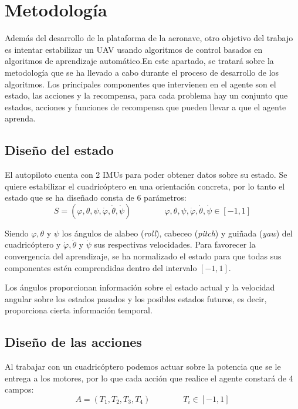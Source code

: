 \chapter{Metodología}

Además del desarrollo de la plataforma de la aeronave, otro objetivo del trabajo es intentar estabilizar un UAV usando algoritmos de control basados en algoritmos de aprendizaje automático.En este apartado, se tratará sobre la metodología que se ha llevado a cabo durante el proceso de desarrollo de los algoritmos. Los principales componentes que intervienen en el agente son el estado, las acciones y la recompensa, para cada problema hay un conjunto que estados, acciones y funciones de recompensa que pueden llevar a que el agente aprenda.

\section{Diseño del estado}
 El autopiloto cuenta con 2 IMUs para poder obtener datos sobre su estado. Se quiere estabilizar el cuadricóptero en una orientación concreta, por lo tanto el estado que se ha diseñado consta de 6 parámetros:
\begin{equation}
	S=(\varphi,\theta,\psi,\dot\varphi,\dot\theta,\dot\psi) \qquad\qquad \varphi,\theta,\psi,\dot\varphi,\dot\theta,\dot\psi \in [-1,1]
\end{equation} 

Siendo $\varphi,\theta$ y $\psi$ los ángulos de alabeo (\textit{roll}), cabeceo (\textit{pitch}) y guiñada (\textit{yaw}) del cuadricóptero y $\dot\varphi,\dot\theta$ y $\dot\psi$ sus respectivas velocidades. Para favorecer la convergencia del aprendizaje, se ha normalizado el estado para que todas sus componentes estén comprendidas dentro del intervalo $[-1,1]$.

Los ángulos proporcionan información sobre el estado actual y la velocidad angular sobre los estados pasados y los posibles estados futuros, es decir, proporciona cierta información temporal. 

\section{Diseño de las acciones}
Al trabajar con un cuadricóptero podemos actuar sobre la potencia que se le entrega a los motores, por lo que cada acción que realice el agente constará de 4 campos:
\begin{equation}
	A = (T_1,T_2,T_3,T_4) \qquad\qquad T_i \in [-1,1]
\end{equation}

